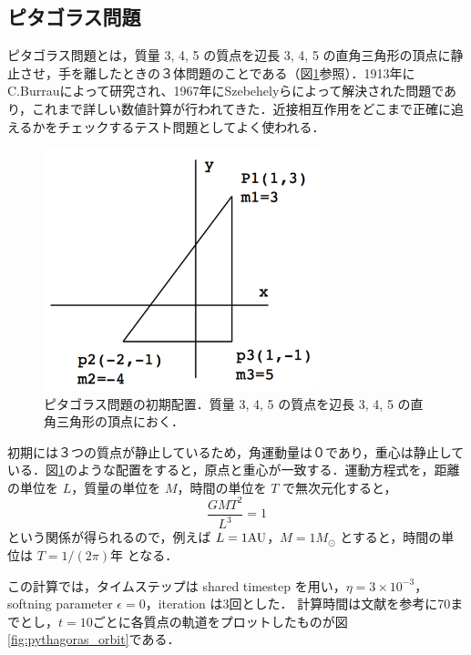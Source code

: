 \documentclass[11pt,a4paper,oneside,onecolumn]{jreport}
\begin{document}
\subsection{ピタゴラス問題}
ピタゴラス問題とは，質量 3, 4, 5 の質点を辺長 3, 4, 5 の直角三角形の頂点に静止させ，手を離したときの３体問題のことである（図\ref{fig:pythagoras}参照）．1913年にC.Burrauによって研究され、1967年にSzebehelyらによって解決された問題であり，これまで詳しい数値計算が行われてきた．近接相互作用をどこまで正確に追えるかをチェックするテスト問題としてよく使われる．

\begin{figure}[H]
\centering
\includegraphics[width=8cm]{./image/pythagoras_1.pdf}
\caption{ピタゴラス問題の初期配置．質量 3, 4, 5 の質点を辺長 3, 4, 5 の直角三角形の頂点におく．\label{fig:pythagoras}}
\end{figure}

初期には３つの質点が静止しているため，角運動量は０であり，重心は静止している．図\ref{fig:pythagoras}のような配置をすると，原点と重心が一致する．運動方程式を，距離の単位を $L$，質量の単位を $M$，時間の単位を $T$ で無次元化すると，
\begin{equation}
\frac{G M T^2}{L^3} = 1
\end{equation}
という関係が得られるので，例えば $L = 1 {\rm AU}$，$M = 1 M_{\odot}$ とすると，時間の単位は $T = 1/(2 \pi) 年$ となる．

この計算では，タイムステップは shared timestep を用い，$\eta = 3 \times 10^{-3}$，softning parameter $\epsilon = 0$，iteration は3回とした． 計算時間は文献を参考に70までとし，$t = 10$ごとに各質点の軌道をプロットしたものが図\ref{fig:pythagoras_orbit}である．
\end{document}
